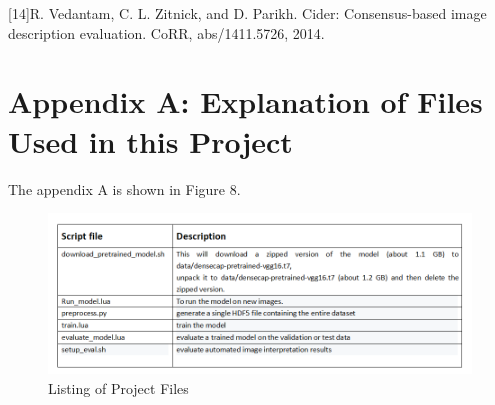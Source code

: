 \documentclass[12pt]{article}%
\begin{document}
[14]R.   Vedantam,   C.   L.   Zitnick,   and D.  Parikh.	Cider: Consensus-based  image  description  evaluation.		CoRR, abs/1411.5726, 2014.\\


%
%
%
%
%
%







\section{Appendix A: Explanation of Files Used in this Project}

The appendix A is shown in Figure 8.

\begin{figure}[t]
\begin{center}
   \includegraphics[width=0.8\linewidth]{ap1.jpg}
\end{center}
   \caption{Listing of Project Files }
\label{fig:circle}
\end{figure}
\end{document}
